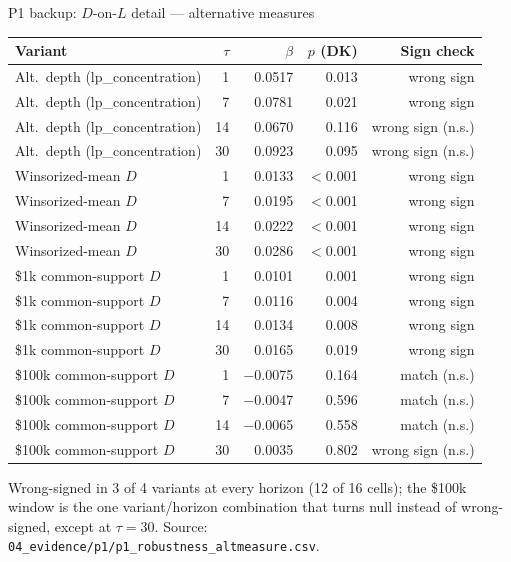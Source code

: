 \documentclass[aspectratio=169]{beamer}
\begin{document}
\begin{frame}{P1 backup: $D$-on-$L$ detail --- alternative measures}
  \tiny
  \begin{center}
  \begin{tabular}{@{}l r r r r@{}}
    \toprule
    Variant & $\tau$ & $\beta$ & $p$ (DK) & Sign check \\
    \midrule
    Alt.\ depth (lp\_concentration) & 1  & 0.0517 & 0.013 & wrong sign \\
    Alt.\ depth (lp\_concentration) & 7  & 0.0781 & 0.021 & wrong sign \\
    Alt.\ depth (lp\_concentration) & 14 & 0.0670 & 0.116 & wrong sign (n.s.) \\
    Alt.\ depth (lp\_concentration) & 30 & 0.0923 & 0.095 & wrong sign (n.s.) \\
    Winsorized-mean $D$ & 1  & 0.0133 & $<$0.001 & wrong sign \\
    Winsorized-mean $D$ & 7  & 0.0195 & $<$0.001 & wrong sign \\
    Winsorized-mean $D$ & 14 & 0.0222 & $<$0.001 & wrong sign \\
    Winsorized-mean $D$ & 30 & 0.0286 & $<$0.001 & wrong sign \\
    \$1k common-support $D$ & 1  & 0.0101 & 0.001 & wrong sign \\
    \$1k common-support $D$ & 7  & 0.0116 & 0.004 & wrong sign \\
    \$1k common-support $D$ & 14 & 0.0134 & 0.008 & wrong sign \\
    \$1k common-support $D$ & 30 & 0.0165 & 0.019 & wrong sign \\
    \$100k common-support $D$ & 1  & $-$0.0075 & 0.164 & match (n.s.) \\
    \$100k common-support $D$ & 7  & $-$0.0047 & 0.596 & match (n.s.) \\
    \$100k common-support $D$ & 14 & $-$0.0065 & 0.558 & match (n.s.) \\
    \$100k common-support $D$ & 30 & 0.0035 & 0.802 & wrong sign (n.s.) \\
    \bottomrule
  \end{tabular}
  \end{center}
  \vspace{0.3em}
  \tiny Wrong-signed in 3 of 4 variants at every horizon (12 of 16 cells); the \$100k window is the one variant/horizon combination that turns null instead of wrong-signed, except at $\tau=30$. Source: \texttt{04\_evidence/p1/p1\_robustness\_altmeasure.csv}.
\end{frame}
\end{document}

